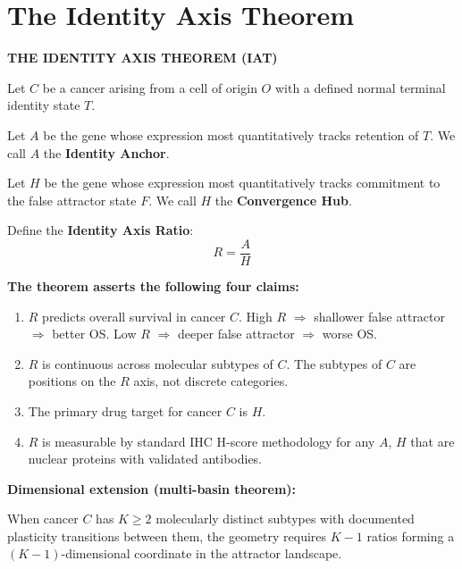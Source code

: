 \documentclass[11pt, a4paper]{article}
\begin{document}
\section{The Identity Axis Theorem}
\label{sec:theorem}

\begin{theoremenv}
\textbf{THE IDENTITY AXIS THEOREM (IAT)}

\medskip
Let $C$ be a cancer arising from a cell of origin $O$
with a defined normal terminal identity state $T$.

Let $A$ be the gene whose expression most quantitatively
tracks retention of $T$. We call $A$ the
\textbf{Identity Anchor}.

Let $H$ be the gene whose expression most quantitatively
tracks commitment to the false attractor state $F$.
We call $H$ the \textbf{Convergence Hub}.

Define the \textbf{Identity Axis Ratio}:
\[
R = \frac{A}{H}
\]

\textbf{The theorem asserts the following four claims:}

\begin{enumerate}
    \item $R$ predicts overall survival in cancer $C$.
    High $R$ $\Rightarrow$ shallower false attractor
    $\Rightarrow$ better OS.
    Low $R$ $\Rightarrow$ deeper false attractor
    $\Rightarrow$ worse OS.

    \item $R$ is continuous across molecular subtypes
    of $C$. The subtypes of $C$ are positions on the
    $R$ axis, not discrete categories.

    \item The primary drug target for cancer $C$ is $H$.

    \item $R$ is measurable by standard IHC H-score
    methodology for any $A$, $H$ that are nuclear
    proteins with validated antibodies.
\end{enumerate}

\textbf{Dimensional extension (multi-basin theorem):}

When cancer $C$ has $K \geq 2$ molecularly distinct
subtypes with documented plasticity transitions between
them, the geometry requires $K-1$ ratios forming a
$(K-1)$-dimensional coordinate in the attractor landscape.
\end{theoremenv}
\end{document}
